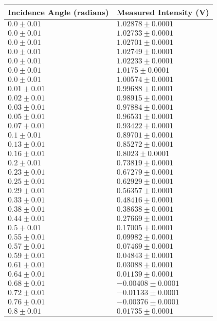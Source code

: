 \begin{tabular}{| p{} | p{} |}
\hline
Incidence Angle (radians) & Measured Intensity (V)\\
\hline
$0.0 \pm 0.01$ & $1.02878 \pm 0.0001$\\
$0.0 \pm 0.01$ & $1.02733 \pm 0.0001$\\
$0.0 \pm 0.01$ & $1.02701 \pm 0.0001$\\
$0.0 \pm 0.01$ & $1.02749 \pm 0.0001$\\
$0.0 \pm 0.01$ & $1.02233 \pm 0.0001$\\
$0.0 \pm 0.01$ & $1.0175 \pm 0.0001$\\
$0.0 \pm 0.01$ & $1.00574 \pm 0.0001$\\
$0.01 \pm 0.01$ & $0.99688 \pm 0.0001$\\
$0.02 \pm 0.01$ & $0.98915 \pm 0.0001$\\
$0.03 \pm 0.01$ & $0.97884 \pm 0.0001$\\
$0.05 \pm 0.01$ & $0.96531 \pm 0.0001$\\
$0.07 \pm 0.01$ & $0.93422 \pm 0.0001$\\
$0.1 \pm 0.01$ & $0.89701 \pm 0.0001$\\
$0.13 \pm 0.01$ & $0.85272 \pm 0.0001$\\
$0.16 \pm 0.01$ & $0.8023 \pm 0.0001$\\
$0.2 \pm 0.01$ & $0.73819 \pm 0.0001$\\
$0.23 \pm 0.01$ & $0.67279 \pm 0.0001$\\
$0.25 \pm 0.01$ & $0.62929 \pm 0.0001$\\
$0.29 \pm 0.01$ & $0.56357 \pm 0.0001$\\
$0.33 \pm 0.01$ & $0.48416 \pm 0.0001$\\
$0.38 \pm 0.01$ & $0.38638 \pm 0.0001$\\
$0.44 \pm 0.01$ & $0.27669 \pm 0.0001$\\
$0.5 \pm 0.01$ & $0.17005 \pm 0.0001$\\
$0.55 \pm 0.01$ & $0.09982 \pm 0.0001$\\
$0.57 \pm 0.01$ & $0.07469 \pm 0.0001$\\
$0.59 \pm 0.01$ & $0.04843 \pm 0.0001$\\
$0.61 \pm 0.01$ & $0.03088 \pm 0.0001$\\
$0.64 \pm 0.01$ & $0.01139 \pm 0.0001$\\
$0.68 \pm 0.01$ & $-0.00408 \pm 0.0001$\\
$0.72 \pm 0.01$ & $-0.01133 \pm 0.0001$\\
$0.76 \pm 0.01$ & $-0.00376 \pm 0.0001$\\
$0.8 \pm 0.01$ & $0.01735 \pm 0.0001$\\
\hline
\end{tabular}\hfill
